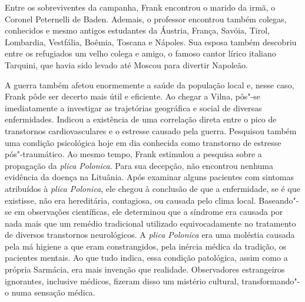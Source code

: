 Entre os sobreviventes da campanha, Frank encontrou o marido da irmã, o
Coronel Peternelli de Baden. Ademais, o professor encontrou também
colegas, conhecidos e mesmo antigos estudantes da Áustria, França,
Savóia, Tirol, Lombardia, Vestfália, Boêmia, Toscana e Nápoles. Sua
esposa também descobriu entre os refugiados um velho colega e amigo, o
famoso cantor lírico italiano Tarquini, que havia sido levado até Moscou
para divertir Napoleão.

A guerra também afetou enormemente a saúde da população local e, nesse
caso, Frank pôde ser decerto mais útil e eficiente. Ao chegar a Vilna,
pôs"-se imediatamente a investigar as trajetórias geográfica e social de
diversas enfermidades. Indicou a existência de uma correlação direta
entre o pico de transtornos cardiovasculares e o estresse causado pela
guerra. Pesquisou também uma condição psicológica hoje em dia conhecida
como transtorno de estresse pós"-traumático. Ao mesmo tempo, Frank
estimulou a pesquisa sobre a propagação da \textit{plica Polonica}. Para
sua decepção, não encontrou nenhuma evidência da doença na Lituânia.
Após examinar alguns pacientes com sintomas atribuídos à \textit{plica
Polonica}, ele chegou à conclusão de que a enfermidade, se é que
existisse, não era hereditária, contagiosa, ou causada pelo clima local.
Baseando"-se em observações científicas, ele determinou que a síndrome
era causada por nada mais que um remédio tradicional utilizado
equivocadamente no tratamento de diversos transtornos neurológicos. A
\textit{plica Polonica} era uma moléstia causada pela má higiene a que
eram constrangidos, pela inércia médica da tradição, os pacientes
mentais. Ao que tudo indica, essa condição patológica, assim como a
própria Sarmácia, era mais invenção que realidade. Observadores
estrangeiros ignorantes, inclusive médicos, fizeram disso um mistério
cultural, transformando"-o numa sensação médica.

